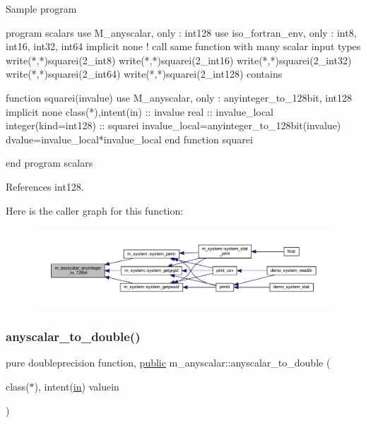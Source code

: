 \begin{DoxyVerb}Sample program

 program scalars
 use M_anyscalar,     only : int128
 use iso_fortran_env, only : int8, int16, int32, int64
 implicit none
    ! call same function with many scalar input types
    write(*,*)squarei(2_int8)
    write(*,*)squarei(2_int16)
    write(*,*)squarei(2_int32)
    write(*,*)squarei(2_int64)
    write(*,*)squarei(2_int128)
 contains

 function squarei(invalue)
 use M_anyscalar, only : anyinteger_to_128bit, int128
 implicit none
 class(*),intent(in)  :: invalue
 real                 :: invalue_local
 integer(kind=int128) :: squarei
    invalue_local=anyinteger_to_128bit(invalue)
    dvalue=invalue_local*invalue_local
 end function squarei

 end program scalars \end{DoxyVerb}
 

References int128.

Here is the caller graph for this function\+:
\nopagebreak
\begin{figure}[H]
\begin{center}
\leavevmode
\includegraphics[width=350pt]{namespacem__anyscalar_a513beeccb5c821157cbd2eea8a1d9842_icgraph}
\end{center}
\end{figure}
\mbox{\label{namespacem__anyscalar_a6173dbc57e7c5a96f5961d9e83e6e15e}} 
\subsubsection{\texorpdfstring{anyscalar\+\_\+to\+\_\+double()}{anyscalar\_to\_double()}}
{\footnotesize\ttfamily pure doubleprecision function, \hyperlink{M__stopwatch_83_8txt_a2f74811300c361e53b430611a7d1769f}{public} m\+\_\+anyscalar\+::anyscalar\+\_\+to\+\_\+double (\begin{DoxyParamCaption}\item[{class($\ast$), intent(\hyperlink{M__journal_83_8txt_afce72651d1eed785a2132bee863b2f38}{in})}]{valuein }\end{DoxyParamCaption})}



